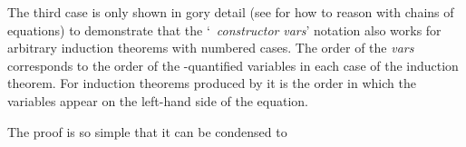 \begin{isabellebody}
\isamarkupfalse%
\isamarkupfalse%
\isamarkupfalse%
\isamarkupfalse%
%
\begin{isamarkuptext}%
\noindent
The third case is only shown in gory detail (see \cite{BauerW-TPHOLs01}
for how to reason with chains of equations) to demonstrate that the
`~\isa{(}\emph{constructor} \emph{vars}\isa{)}' notation also
works for arbitrary induction theorems with numbered cases. The order
of the \emph{vars} corresponds to the order of the
\isa{{\isasymAnd}}-quantified variables in each case of the induction
theorem. For induction theorems produced by  it is
the order in which the variables appear on the left-hand side of the
equation.

The proof is so simple that it can be condensed to%
\end{isamarkuptext}%
\isamarkuptrue%
\isamarkupfalse%
\isanewline
\isamarkupfalse%
\isamarkupfalse%
\end{isabellebody}%
